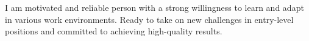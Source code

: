 
\begin{cvparagraph}
I am motivated and reliable person with a strong willingness to learn and adapt in various work environments.
Ready to take on new challenges in entry-level positions and committed to achieving high-quality results.


\end{cvparagraph}
